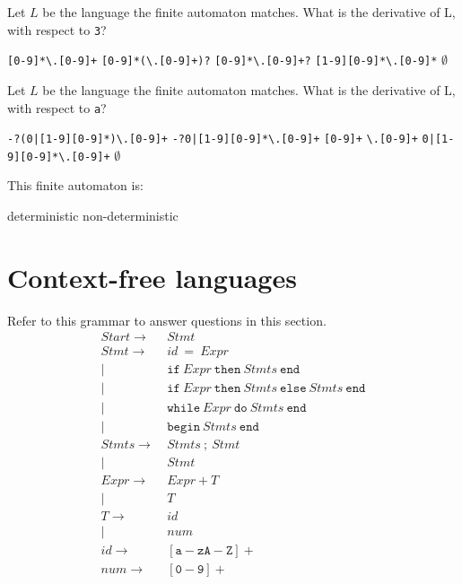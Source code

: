 \documentclass[addpoints]{exam}
\begin{document}
\begin{questions}
\answerline

\question Let $L$ be the language the finite automaton matches. What is the derivative of L, with respect to \verb$3$?

\begin{choices}
\choice \verb$[0-9]*\.[0-9]+$
\choice \verb$[0-9]*(\.[0-9]+)?$
\choice \verb$[0-9]*\.[0-9]+?$
\choice \verb$[1-9][0-9]*\.[0-9]*$
\choice $\emptyset$
\end{choices}

\answerline

\question Let $L$ be the language the finite automaton matches. What is the derivative of L, with respect to \verb$a$?

\begin{choices}
\choice \verb$-?(0|[1-9][0-9]*)\.[0-9]+$
\choice \verb$-?0|[1-9][0-9]*\.[0-9]+$
\choice \verb$[0-9]+$
\choice \verb$\.[0-9]+$
\choice \verb$0|[1-9][0-9]*\.[0-9]+$
\choice $\emptyset$
\end{choices}

\answerline

\question This finite automaton is:
\begin{oneparchoices}
\choice deterministic
\choice non-deterministic
\end{oneparchoices}
\answerline
\pagebreak

\section{Context-free languages}
Refer to this grammar to answer questions in this section.
\begin{align*}
Start \to&~Stmt\\
Stmt \to&~id~\mathtt{=}~Expr\\
 |&~\mathtt{if}~Expr~\mathtt{then}~Stmts~\mathtt{end}\\
 |&~\mathtt{if}~Expr~\mathtt{then}~Stmts~\mathtt{else}~Stmts~\mathtt{end}\\
 |&~\mathtt{while}~Expr~\mathtt{do}~Stmts~\mathtt{end}\\
 |&~\mathtt{begin}~Stmts~\mathtt{end}\\
Stmts \to&~Stmts~\mathtt{;}~Stmt\\
|&~Stmt\\
Expr \to&~Expr~\mathtt{+}~T\\
|&~T\\
T \to&~id\\
|&~num\\
id \to&~\mathtt{[a-zA-Z]+}\\
num \to&~\mathtt{[0-9]+}
\end{align*}


\end{questions}
\end{document}
